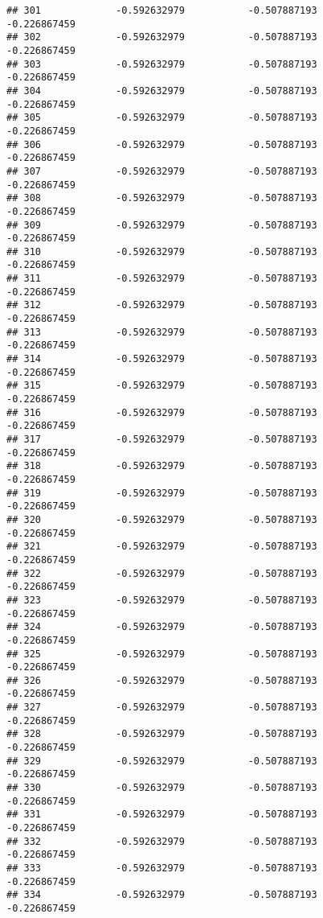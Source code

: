 \documentclass[]{article}
\begin{document}
\begin{verbatim}
## 301             -0.592632979           -0.507887193           -0.226867459
## 302             -0.592632979           -0.507887193           -0.226867459
## 303             -0.592632979           -0.507887193           -0.226867459
## 304             -0.592632979           -0.507887193           -0.226867459
## 305             -0.592632979           -0.507887193           -0.226867459
## 306             -0.592632979           -0.507887193           -0.226867459
## 307             -0.592632979           -0.507887193           -0.226867459
## 308             -0.592632979           -0.507887193           -0.226867459
## 309             -0.592632979           -0.507887193           -0.226867459
## 310             -0.592632979           -0.507887193           -0.226867459
## 311             -0.592632979           -0.507887193           -0.226867459
## 312             -0.592632979           -0.507887193           -0.226867459
## 313             -0.592632979           -0.507887193           -0.226867459
## 314             -0.592632979           -0.507887193           -0.226867459
## 315             -0.592632979           -0.507887193           -0.226867459
## 316             -0.592632979           -0.507887193           -0.226867459
## 317             -0.592632979           -0.507887193           -0.226867459
## 318             -0.592632979           -0.507887193           -0.226867459
## 319             -0.592632979           -0.507887193           -0.226867459
## 320             -0.592632979           -0.507887193           -0.226867459
## 321             -0.592632979           -0.507887193           -0.226867459
## 322             -0.592632979           -0.507887193           -0.226867459
## 323             -0.592632979           -0.507887193           -0.226867459
## 324             -0.592632979           -0.507887193           -0.226867459
## 325             -0.592632979           -0.507887193           -0.226867459
## 326             -0.592632979           -0.507887193           -0.226867459
## 327             -0.592632979           -0.507887193           -0.226867459
## 328             -0.592632979           -0.507887193           -0.226867459
## 329             -0.592632979           -0.507887193           -0.226867459
## 330             -0.592632979           -0.507887193           -0.226867459
## 331             -0.592632979           -0.507887193           -0.226867459
## 332             -0.592632979           -0.507887193           -0.226867459
## 333             -0.592632979           -0.507887193           -0.226867459
## 334             -0.592632979           -0.507887193           -0.226867459

\end{verbatim}
\end{document}
